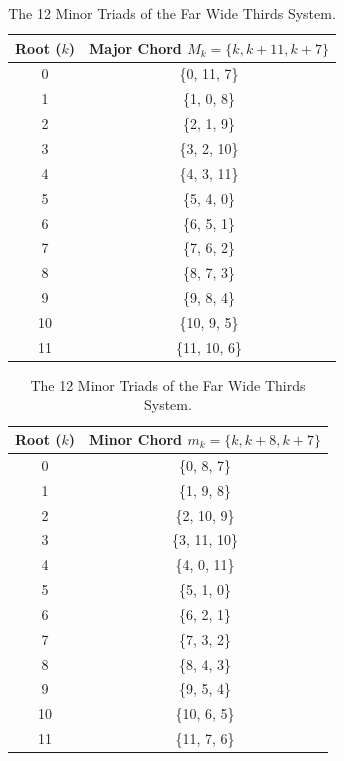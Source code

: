 \documentclass[12pt,letterpaper]{amsart}
\begin{document}
\begin{table}[H]
\centering
\scriptsize
\renewcommand{\arraystretch}{1.0}
\begin{minipage}{0.48\textwidth}
\centering
\begin{tabular}{|c|c|}
\hline
\textbf{Root} ($k$) & \textbf{Major Chord} $M_k = \{k, k+11, k+7\}$ \\
\hline
0 & \{0, 11, 7\} \\
1 & \{1, 0, 8\} \\
2 & \{2, 1, 9\} \\
3 & \{3, 2, 10\} \\
4 & \{4, 3, 11\} \\
5 & \{5, 4, 0\} \\
6 & \{6, 5, 1\} \\
7 & \{7, 6, 2\} \\
8 & \{8, 7, 3\} \\
9 & \{9, 8, 4\} \\
10 & \{10, 9, 5\} \\
11 & \{11, 10, 6\} \\
\hline
\end{tabular}
\caption{\scriptsize The 12 Major Triads of the Far Wide Thirds System.}
\label{tab:far_wide_major_def}
\end{minipage}
\hfill
\begin{minipage}{0.48\textwidth}
\centering
\begin{tabular}{|c|c|}
\hline
\textbf{Root} ($k$) & \textbf{Minor Chord} $m_k = \{k, k+8, k+7\}$ \\
\hline
0 & \{0, 8, 7\} \\
1 & \{1, 9, 8\} \\
2 & \{2, 10, 9\} \\
3 & \{3, 11, 10\} \\
4 & \{4, 0, 11\} \\
5 & \{5, 1, 0\} \\
6 & \{6, 2, 1\} \\
7 & \{7, 3, 2\} \\
8 & \{8, 4, 3\} \\
9 & \{9, 5, 4\} \\
10 & \{10, 6, 5\} \\
11 & \{11, 7, 6\} \\
\hline
\end{tabular}
\caption{\scriptsize The 12 Minor Triads of the Far Wide Thirds System.}
\label{tab:far_wide_minor_def}
\end{minipage}
\end{table}
\end{document}
